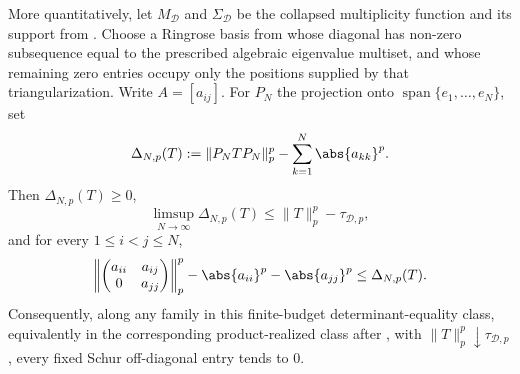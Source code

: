 \begin{theorem}
  More quantitatively, let \(M_{\mathcal D}\) and
  \(\Sigma_{\mathcal D}\) be the collapsed multiplicity function and its
  support from . Choose a
  Ringrose basis from
   whose diagonal has non-zero
  subsequence equal to the prescribed algebraic eigenvalue multiset, and
  whose remaining zero entries occupy only the positions supplied by that
  triangularization. Write \(A=[a_{ij}]\). For
  \(P_N\) the projection onto
  \(\operatorname{span}\{e_1,\ldots,e_N\}\), set
  \[
    \Delta_{N,p}(T)
    :=\|P_NTP_N\|_p^p-\sum_{k=1}^N\abs{a_{kk}}^p .
  \]
  Then \(\Delta_{N,p}(T)\ge0\),
  \[
    \limsup_{N\to\infty}\Delta_{N,p}(T)
    \le \|T\|_p^p-\tau_{\mathcal D,p},
  \]
  and for every \(1\le i<j\le N\),
  \[
    \left\|
      \begin{pmatrix}
        a_{ii} & a_{ij}\\
        0 & a_{jj}
      \end{pmatrix}
    \right\|_p^p-\abs{a_{ii}}^p-\abs{a_{jj}}^p
    \le \Delta_{N,p}(T).
  \]
  Consequently, along any family in this finite-budget determinant-equality
  class, equivalently in the corresponding product-realized class after
  ,
  with \(\|T\|_p^p\downarrow\tau_{\mathcal D,p}\), every fixed Schur
  off-diagonal entry tends to \(0\).
\end{theorem}

